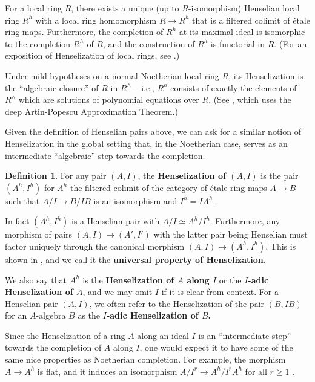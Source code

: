 \documentclass[12pt]{article}
\newcommand{\Et}{\'etale\xspace}
\newcommand{\spcite}[2]{\cite[\href{https://stacks.math.columbia.edu/tag/#1}{{#2} {#1}}]{stackp}}
\theoremstyle{definition}
\newtheorem{definition}[theorem]{Definition}
\numberwithin{equation}{subsection}
\begin{document}
For a local ring $R$, there exists a unique (up to $R$-isomorphism) Henselian local ring $R^h$ with a local ring homomorphism $R \to R^h$ that is a filtered colimit of \Et ring maps. Furthermore, the completion of $R^h$ at its maximal ideal is isomorphic to the completion  $R^\wedge$ of $R$, and the construction of $R^h$ is functorial in $R$. (For an exposition of Henselization of local rings, see \spcite{0BSK}{Section}.) 

Under mild hypotheses on a normal Noetherian local ring $R$, its Henselization is the ``algebraic closure'' of $R$ in $R^\wedge$ -- i.e., $R^h$ consists of exactly the elements of $R^\wedge$ which are solutions of polynomial equations over $R$. (See \spcite{07QX}{Section}, which uses the deep Artin-Popescu Approximation Theorem.)

Given the definition of Henselian pairs above, we can ask for a similar notion of Henselization in the global setting that, in the Noetherian case, serves as an intermediate ``algebraic'' step towards the completion. 

\begin{definition}\label{def:henselization} For any pair $(A,I)$, the {\bf Henselization of $(A,I)$} is the pair $(A^h,I^h)$ for $A^h$ the filtered colimit of the category of \Et ring maps $A \to B$ such that $A/I \to B/IB$ is an isomorphism and $I^h=IA^h$. 
\end{definition}

In fact $(A^h,I^h)$ is a Henselian pair with $A/I \simeq A^h/I^h$. Furthermore, any morphism of pairs $(A,I) \to (A',I')$ with the latter pair being Henselian must factor uniquely through the canonical morphism $(A,I) \to (A^h,I^h)$. This is shown in \spcite{0A02}{Lemma}, and we call it the {\bf universal property of Henselization.}

We also say that $A^h$ is the {\bf Henselization of $A$ along $I$} or the {\bf $I$-adic Henselization of $A$}, and we may omit $I$ if it is clear from context. For a Henselian pair $(A,I)$, we often refer to the Henselization of the pair $(B,IB)$ for an $A$-algebra $B$ as the {\bf $I$-adic Henselization of $B$.}

Since the Henselization of a ring $A$ along an ideal $I$ is an ``intermediate step'' towards the completion of $A$ along $I$, one would expect it to have some of the same nice properties as Noetherian completion. For example, the morphism $A \to A^h$ is flat, and it induces an isomorphism $A/I^r \to A^h/I^rA^h$ for all $r \ge 1$  \spcite{0AGU}{Lemma}. 
\end{document}
